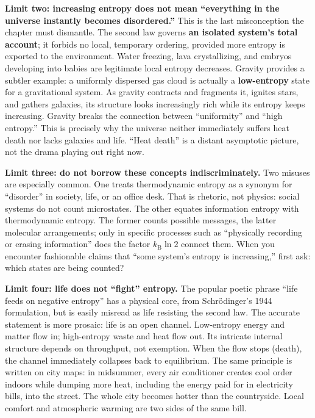 \textbf{Limit two: increasing entropy does not mean ``everything in the universe instantly becomes disordered.''} This is the last misconception the chapter must dismantle. The second law governs \textbf{an isolated system's total account}; it forbids no local, temporary ordering, provided more entropy is exported to the environment. Water freezing, lava crystallizing, and embryos developing into babies are legitimate local entropy decreases. Gravity provides a subtler example: a uniformly dispersed gas cloud is actually a \textbf{low-entropy} state for a gravitational system. As gravity contracts and fragments it, ignites stars, and gathers galaxies, its structure looks increasingly rich while its entropy keeps increasing. Gravity breaks the connection between ``uniformity'' and ``high entropy.'' This is precisely why the universe neither immediately suffers heat death nor lacks galaxies and life. ``Heat death'' is a distant asymptotic picture, not the drama playing out right now.

\textbf{Limit three: do not borrow these concepts indiscriminately.} Two misuses are especially common. One treats thermodynamic entropy as a synonym for ``disorder'' in society, life, or an office desk. That is rhetoric, not physics: social systems do not count microstates. The other equates information entropy with thermodynamic entropy. The former counts possible messages, the latter molecular arrangements; only in specific processes such as ``physically recording or erasing information'' does the factor $k_{\mathrm{B}}\ln2$ connect them. When you encounter fashionable claims that ``some system's entropy is increasing,'' first ask: which states are being counted?

\textbf{Limit four: life does not ``fight'' entropy.} The popular poetic phrase ``life feeds on negative entropy'' has a physical core, from Schrödinger's 1944 formulation, but is easily misread as life resisting the second law. The accurate statement is more prosaic: life is an open channel. Low-entropy energy and matter flow in; high-entropy waste and heat flow out. Its intricate internal structure depends on throughput, not exemption. When the flow stops (death), the channel immediately collapses back to equilibrium. The same principle is written on city maps: in midsummer, every air conditioner creates cool order indoors while dumping more heat, including the energy paid for in electricity bills, into the street. The whole city becomes hotter than the countryside. Local comfort and atmospheric warming are two sides of the same bill.

